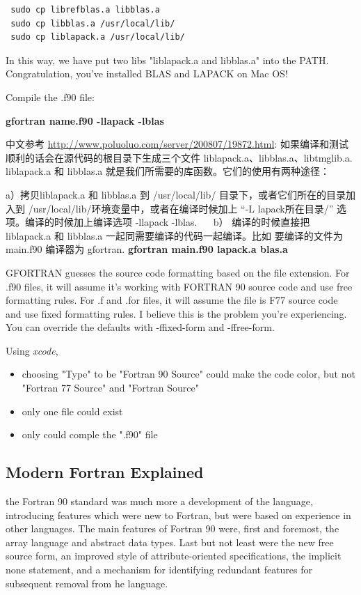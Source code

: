 \begin{verbatim}
 sudo cp librefblas.a libblas.a
 sudo cp libblas.a /usr/local/lib/
 sudo cp liblapack.a /usr/local/lib/
\end{verbatim}

In this way, we have put two libs "liblapack.a and libblas.a" into the PATH. Congratulation, you’ve installed BLAS and LAPACK on Mac OS!

Compile the .f90 file:

\textbf{gfortran name.f90 -llapack -lblas}


中文参考 \url{http://www.poluoluo.com/server/200807/19872.html}: 如果编译和测试顺利的话会在源代码的根目录下生成三个文件 liblapack.a、libblas.a、libtmglib.a. liblapack.a 和 libblas.a 就是我们所需要的库函数。它们的使用有两种途径：

a）拷贝liblapack.a 和 libblas.a 到 /usr/local/lib/ 目录下，或者它们所在的目录加入到 /usr/local/lib/环境变量中，或者在编译时候加上 “-L lapack所在目录/” 选项。编译的时候加上编译选项 -llapack -lblas.
　
b） 编译的时候直接把 liblapack.a 和 libblas.a 一起同需要编译的代码一起编译。比如 要编译的文件为 main.f90 编译器为 gfortran.  \textbf{gfortran main.f90 lapack.a blas.a}

GFORTRAN guesses the source code formatting based on the file extension. For .f90 files, it will assume it’s working with FORTRAN 90 source code and use free formatting rules. For .f and .for files, it will assume the file is F77 source code and use fixed formatting rules. I believe this is the problem you’re experiencing. You can override the defaults with -ffixed-form and -ffree-form.

Using \textit{xcode},

\begin{itemize}
\item  choosing "Type" to be "Fortran 90 Source" could make the code color, but not  "Fortran 77 Source" and "Fortran Source"
\item  only one file could exist
\item  only could comple the ".f90" file 

\end{itemize}

\subsection{Modern Fortran Explained}

the Fortran 90 standard was much more a development of the language, introducing features which were new to Fortran, but were based on experience in other languages. The main features of Fortran 90 were, first and foremost, the array language and abstract data types. Last but not least were the new free source form, an improved style of attribute-oriented specifications, the implicit none statement, and a mechanism for identifying redundant features for subsequent removal from he language.

